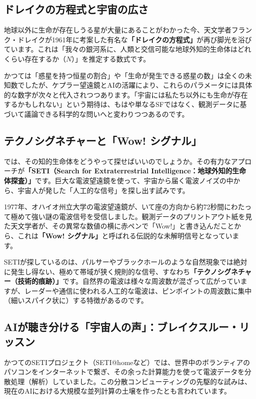 \subsection{ドレイクの方程式と宇宙の広さ}

地球以外に生命が存在しうる星が大量にあることがわかった今、天文学者フランク・ドレイクが1961年に考案した有名な\textbf{「ドレイクの方程式」}が再び脚光を浴びています。これは「我々の銀河系に、人類と交信可能な地球外知的生命体はどれくらい存在するか（\(N\)）」を推定する数式です。

かつては「惑星を持つ恒星の割合」や「生命が発生できる惑星の数」は全くの未知数でしたが、ケプラー望遠鏡とAIの活躍により、これらのパラメータには具体的な数字が次々と代入されつつあります。「宇宙には私たち以外にも生命が存在するかもしれない」という期待は、もはや単なるSFではなく、観測データに基づいて議論できる科学的な問いへと変わりつつあるのです。

\subsection{テクノシグネチャーと「Wow! シグナル」}

では、その知的生命体をどうやって探せばいいのでしょうか。その有力なアプローチが\textbf{「SETI（Search for Extraterrestrial Intelligence：地球外知的生命体探査）」}です。巨大な電波望遠鏡を使って、宇宙から届く電波ノイズの中から、宇宙人が発した「人工的な信号」を探し出す試みです。

1977年、オハイオ州立大学の電波望遠鏡が、いて座の方向から約72秒間にわたって極めて強い謎の電波信号を受信しました。観測データのプリントアウト紙を見た天文学者が、その異常な数値の横に赤ペンで「Wow!」と書き込んだことから、これは\textbf{「Wow! シグナル」}と呼ばれる伝説的な未解明信号となっています。

SETIが探しているのは、パルサーやブラックホールのような自然現象では絶対に発生し得ない、極めて帯域が狭く規則的な信号、すなわち\textbf{「テクノシグネチャー（技術的痕跡）」}です。自然界の電波は様々な周波数が混ざって広がっていますが、レーダーや通信に使われる人工的な電波は、ピンポイントの周波数に集中（細いスパイク状に）する特徴があるのです。

\subsection{AIが聴き分ける「宇宙人の声」：ブレイクスルー・リッスン}

かつてのSETIプロジェクト（SETI@homeなど）では、世界中のボランティアのパソコンをインターネットで繋ぎ、その余った計算能力を使って電波データを分散処理（解析）していました。この分散コンピューティングの先駆的な試みは、現在のAIにおける大規模な並列計算の土壌を作ったとも言われています。

